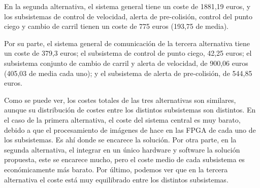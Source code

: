 \par  En la segunda alternativa, el sistema general tiene un coste de 1881,19 euros, y los subsistemas de control de velocidad, alerta de pre-colisión, control del punto ciego y cambio de carril tienen un coste de 775 euros (193,75 de media).

\par Por su parte, el sistema general de comunicación de la tercera alternativa tiene un coste de 379,3 euros; el subsistema de control de punto ciego, 42,25 euros; el subsistema conjunto de cambio de carril y alerta de velocidad, de 900,06 euros (405,03 de media cada uno); y el subsistema de alerta de pre-colisión, de 544,85 euros.

\par Como se puede ver, los costes totales de las tres alternativas son similares, aunque su distribución de costes entre los distintos subsistemas son distintos. En el caso de la primera alternativa, el coste del sistema central es muy barato, debido a que el procesamiento de imágenes de hace en las FPGA de cada uno de los subsistemas. Es ahí donde se encarece la solución. Por otra parte, en la segunda alternativa, el integrar en un único hardware y software la solución propuesta, este se encarece mucho, pero el coste medio de cada subsistema es económicamente más barato. Por último, podemos ver que en la tercera alternativa el coste está muy equilibrado entre los distintos subsistemas.
